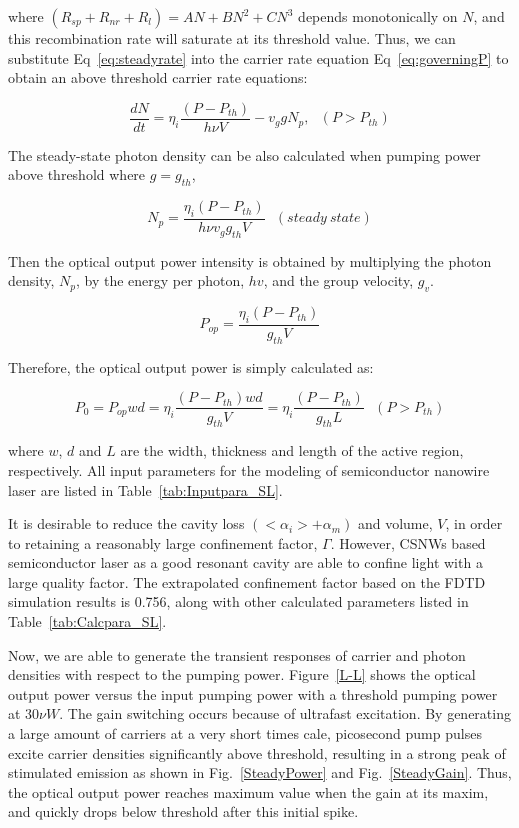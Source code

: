 where $(R_{sp} + R_{nr} + R_{l}) =AN + BN^2 +CN^3$ depends monotonically on
$N$, and this recombination rate will saturate at its threshold value.  Thus,
we can substitute Eq~\ref{eq:steadyrate} into the carrier rate equation
Eq~\ref{eq:governingP} to obtain an above threshold carrier rate equations:

\begin{equation}
  \frac{dN}{dt} = \eta_i \frac{(P - P_{th})}{h\nu{V}} - v_{g}gN_p,~~~   (P > P_{th})
\end{equation}

The steady-state photon density can be also calculated when pumping power above
threshold where $g = g_{th}$,

\begin{equation}
  N_p = \frac{\eta_i (P - P_{th})}{h{\nu}v_{g}g_{th}V}~~~   (steady~ state)
\end{equation}

Then the optical output power intensity is obtained
by multiplying the photon density, $N_p$, by the energy per
photon, $hv$, and the group velocity, $g_v$.

\begin{equation}
  P_{op} = \frac{\eta_{i}(P-P_{th})}{g_{th}V}
\end{equation}

Therefore, the optical output power is simply calculated as:

\begin{equation}
  P_0 = P_{op}wd =\eta_i\frac{(P-P_{th})wd}{g_{th}V}=\eta_i\frac{(P-P_{th})}{g_{th}L}~~~(P > P_{th})
\end{equation}

where $w$, $d$ and $L$ are the width, thickness and length of the active
region, respectively. All input parameters for the modeling of semiconductor
nanowire laser are listed in Table~\ref{tab:Inputpara_SL}.



It is desirable to reduce the cavity loss $(<\alpha_i> + \alpha_m)$ and volume,
$V$, in order to retaining a reasonably large confinement factor, $\Gamma$.
However, CSNWs based semiconductor laser as a good resonant cavity are able to
confine light with a large quality factor. The extrapolated confinement
factor based on the FDTD simulation results is 0.756, along with other
calculated parameters listed in Table~\ref{tab:Calcpara_SL}.



Now, we are able to generate the transient responses of carrier and photon
densities with respect to the pumping power. Figure~\ref{L-L} shows the optical
output power versus the input pumping power with a threshold pumping power at
$30 \nu{W}$. The gain switching occurs because of ultrafast excitation. By
generating a large amount of carriers at a very short times cale, picosecond
pump pulses excite carrier densities significantly above threshold, resulting
in a strong peak of stimulated emission as shown in Fig.~\ref{SteadyPower} and
Fig.~\ref{SteadyGain}. Thus, the optical output power reaches maximum value
when the gain at its maxim, and quickly drops below threshold after this
initial spike. 

